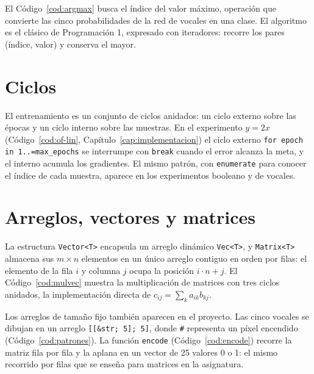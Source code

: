 El Código~\ref{cod:argmax} busca el índice del valor máximo, operación que convierte las cinco probabilidades de la red de vocales en una clase. El algoritmo es el clásico de Programación 1, expresado con iteradores: recorre los pares (índice, valor) y conserva el mayor.



\section{Ciclos}
El entrenamiento es un conjunto de ciclos anidados: un ciclo externo sobre las épocas y un ciclo interno sobre las muestras. En el experimento $y=2x$ (Código~\ref{cod:of-lin}, Capítulo~\ref{cap:implementacion}) el ciclo externo \texttt{for epoch in 1..=max\_epochs} se interrumpe con \texttt{break} cuando el error alcanza la meta, y el interno acumula los gradientes. El mismo patrón, con \texttt{enumerate} para conocer el índice de cada muestra, aparece en los experimentos booleano y de vocales.

\section{Arreglos, vectores y matrices}
La estructura \texttt{Vector<T>} encapsula un arreglo dinámico \texttt{Vec<T>}, y \texttt{Matrix<T>} almacena sus $m\times n$ elementos en un único arreglo contiguo en orden por filas: el elemento de la fila $i$ y columna $j$ ocupa la posición $i\cdot n+j$. El Código~\ref{cod:mulvec} muestra la multiplicación de matrices con tres ciclos anidados, la implementación directa de $c_{ij}=\sum_k a_{ik}b_{kj}$.



Los arreglos de tamaño fijo también aparecen en el proyecto. Las cinco vocales se dibujan en un arreglo \texttt{[[\&str; 5]; 5]}, donde \texttt{\#} representa un píxel encendido (Código~\ref{cod:patrones}). La función \texttt{encode} (Código~\ref{cod:encode}) recorre la matriz fila por fila y la aplana en un vector de 25 valores 0 o 1: el mismo recorrido por filas que se enseña para matrices en la asignatura.




